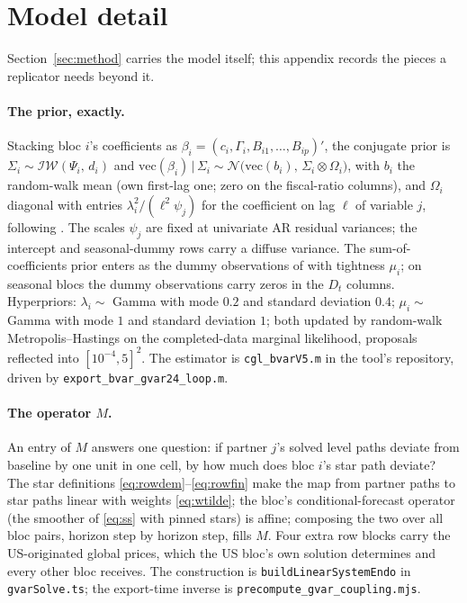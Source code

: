 \documentclass[11pt]{article}
\newcommand{\code}[1]{\texttt{\small #1}}
\begin{document}
\appendix
\section{Model detail}\label{app:model}

Section~\ref{sec:method} carries the model itself; this appendix records the pieces a
replicator needs beyond it.

\paragraph{The prior, exactly.} Stacking bloc $i$'s coefficients as
$\beta_i=(c_i,\Gamma_i,B_{i1},\dots,B_{ip})'$, the conjugate prior is
$\Sigma_i\sim\mathcal{IW}(\Psi_i,\,d_i)$ and
$\mathrm{vec}(\beta_i)\,|\,\Sigma_i\sim\mathcal N\!\bigl(\mathrm{vec}(b_i),\,\Sigma_i\otimes\Omega_i\bigr)$,
with $b_i$ the random-walk mean (own first-lag one; zero on the fiscal-ratio columns), and
$\Omega_i$ diagonal with entries $\lambda_i^2/(\ell^2\psi_j)$ for the coefficient on lag
$\ell$ of variable $j$, following \citet{Giannone2015}. The scales $\psi_j$ are fixed at
univariate AR residual variances; the intercept and seasonal-dummy rows carry a diffuse
variance. The sum-of-coefficients prior enters as the dummy observations of
\citet{DoanLittermanSims1984} with tightness $\mu_i$; on seasonal blocs the dummy
observations carry zeros in the $D_t$ columns. Hyperpriors: $\lambda_i\sim$ Gamma with mode
$0.2$ and standard deviation $0.4$; $\mu_i\sim$ Gamma with mode $1$ and standard deviation
$1$; both updated by random-walk Metropolis--Hastings on the completed-data marginal
likelihood, proposals reflected into $[10^{-4},5]^2$. The estimator is
\code{cgl\_bvarV5.m} in the tool's repository, driven by
\code{export\_bvar\_gvar24\_loop.m}.

\paragraph{The operator $M$.} An entry of $M$ answers one question: if partner $j$'s solved
level paths deviate from baseline by one unit in one cell, by how much does bloc $i$'s star
path deviate? The star definitions \eqref{eq:rowdem}--\eqref{eq:rowfin} make the map from
partner paths to star paths linear with weights \eqref{eq:wtilde}; the bloc's
conditional-forecast operator (the smoother of \eqref{eq:ss} with pinned stars) is affine;
composing the two over all bloc pairs, horizon step by horizon step, fills $M$. Four extra
row blocks carry the US-originated global prices, which the US bloc's own solution
determines and every other bloc receives. The construction is
\code{buildLinearSystemEndo} in \code{gvarSolve.ts}; the export-time inverse is
\code{precompute\_gvar\_coupling.mjs}.
\end{document}
